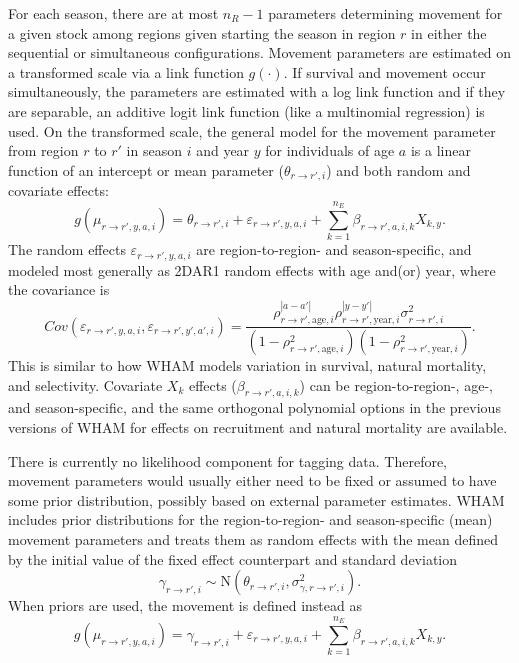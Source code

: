\documentclass[
]{article}
\begin{document}
For each season, there are at most \(n_R-1\) parameters determining movement for a given stock among regions given starting the season in region \(r\) in either the sequential or simultaneous configurations. Movement parameters are estimated on a transformed scale via a link function \(g(\cdot)\). If survival and movement occur simultaneously, the parameters are estimated with a log link function and if they are separable, an additive logit link function (like a multinomial regression) is used. On the transformed scale, the general model for the movement parameter from region \(r\) to \(r'\) in season \(i\) and year \(y\) for individuals of age \(a\) is a linear function of an intercept or mean parameter (\(\theta_{r\rightarrow r',i}\)) and both random and covariate effects:
\begin{equation*}
  g(\mu_{r\rightarrow r',y,a,i}) = \theta_{r\rightarrow r',i} + \varepsilon_{r\rightarrow r',y,a,i} + \sum^{n_E}_{k=1} \beta_{r \rightarrow r',a,i,k} X_{k,y}.
\end{equation*}
The random effects \(\varepsilon_{r\rightarrow r',y,a,i}\) are region-to-region- and season-specific, and modeled most generally as 2DAR1 random effects with age and(or) year, where the covariance is
\begin{equation*}
  Cov\left(\varepsilon_{r\rightarrow r',y,a,i},\varepsilon_{r\rightarrow r',y',a',i}\right) =   \frac{\rho_{r\rightarrow r',\text{age},i}^{|a-a'|}\rho_{r\rightarrow r',\text{year},i}^{|y-y'|}\sigma^2_{r\rightarrow r',i}}{\left(1 -  \rho_{r\rightarrow r',\text{age},i}^2\right)\left(1 - \rho_{r\rightarrow r',\text{year},i}^2\right)}.
\end{equation*}
This is similar to how WHAM models variation in survival, natural mortality, and selectivity. Covariate \(X_k\) effects (\(\beta_{r\rightarrow r',a,i,k}\)) can be region-to-region-, age-, and season-specific, and the same orthogonal polynomial options in the previous versions of WHAM for effects on recruitment and natural mortality are available.

There is currently no likelihood component for tagging data. Therefore, movement parameters would usually either need to be fixed or assumed to have some prior distribution, possibly based on external parameter estimates. WHAM includes prior distributions for the region-to-region- and season-specific (mean) movement parameters and treats them as random effects with the mean defined by the initial value of the fixed effect counterpart and standard deviation
\begin{equation*}
  \gamma_{r\rightarrow r',i} \sim \text{N}\left(\theta_{r\rightarrow r',i}, \sigma^2_{\gamma,r\rightarrow r',i}\right).
  \end{equation*}
When priors are used, the movement is defined instead as
\begin{equation*}
  g(\mu_{r\rightarrow r',y,a,i}) = \gamma_{r\rightarrow r',i} + \varepsilon_{r\rightarrow r',y,a,i} + \sum^{n_E}_{k=1} \beta_{r\rightarrow r',a,i,k} X_{k,y}.
  \end{equation*}
\end{document}
